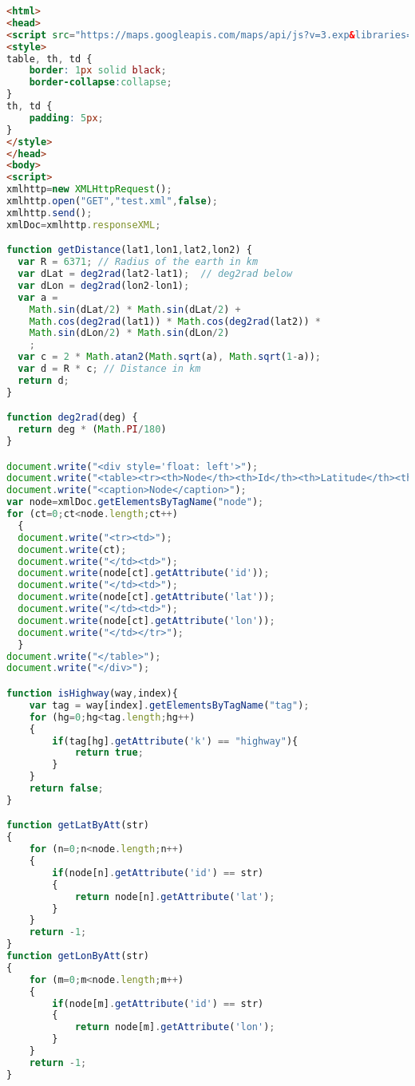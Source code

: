\begin{lstlisting}[language=HTML,basicstyle=\tiny,caption=xml\_parsing.html]
<html>
<head>
<script src="https://maps.googleapis.com/maps/api/js?v=3.exp&libraries=geometry"></script>
<style>
table, th, td {
    border: 1px solid black;
    border-collapse:collapse;
}
th, td {
    padding: 5px;
}
</style>
</head>
<body>
<script>
xmlhttp=new XMLHttpRequest();
xmlhttp.open("GET","test.xml",false);
xmlhttp.send();
xmlDoc=xmlhttp.responseXML;

function getDistance(lat1,lon1,lat2,lon2) {
  var R = 6371; // Radius of the earth in km
  var dLat = deg2rad(lat2-lat1);  // deg2rad below
  var dLon = deg2rad(lon2-lon1); 
  var a = 
    Math.sin(dLat/2) * Math.sin(dLat/2) +
    Math.cos(deg2rad(lat1)) * Math.cos(deg2rad(lat2)) * 
    Math.sin(dLon/2) * Math.sin(dLon/2)
    ; 
  var c = 2 * Math.atan2(Math.sqrt(a), Math.sqrt(1-a)); 
  var d = R * c; // Distance in km
  return d;
}

function deg2rad(deg) {
  return deg * (Math.PI/180)
}

document.write("<div style='float: left'>");
document.write("<table><tr><th>Node</th><th>Id</th><th>Latitude</th><th>Longitude</th></tr>");
document.write("<caption>Node</caption>");
var node=xmlDoc.getElementsByTagName("node");
for (ct=0;ct<node.length;ct++)
  {
  document.write("<tr><td>");
  document.write(ct);
  document.write("</td><td>");
  document.write(node[ct].getAttribute('id'));
  document.write("</td><td>");
  document.write(node[ct].getAttribute('lat'));
  document.write("</td><td>");
  document.write(node[ct].getAttribute('lon'));
  document.write("</td></tr>");
  }
document.write("</table>");
document.write("</div>");

function isHighway(way,index){
	var tag = way[index].getElementsByTagName("tag");
	for (hg=0;hg<tag.length;hg++)
	{
		if(tag[hg].getAttribute('k') == "highway"){
			return true;
		}
	}
	return false;
}

function getLatByAtt(str)
{
	for (n=0;n<node.length;n++)
	{
		if(node[n].getAttribute('id') == str)
		{
			return node[n].getAttribute('lat');
		}
	}
	return -1;
}
function getLonByAtt(str)
{
	for (m=0;m<node.length;m++)
	{
		if(node[m].getAttribute('id') == str)
		{
			return node[m].getAttribute('lon');
		}
	}
	return -1;
}


\end{lstlisting}
